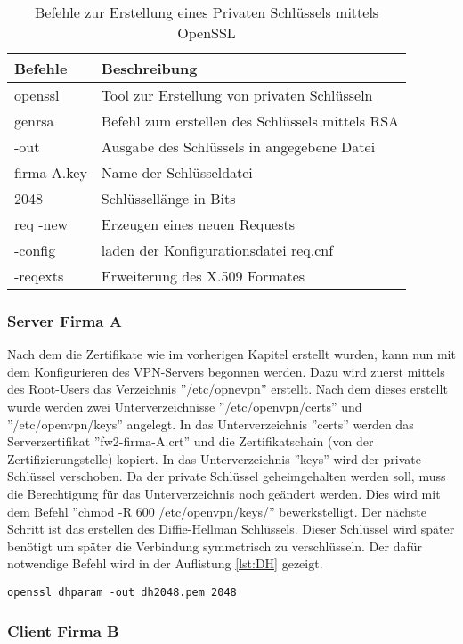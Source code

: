 \begin{table}[h]
	\centering
\begin{tabular}{|l|l|}
	\hline 
	Befehle & Beschreibung \\ 
	\hline 
	openssl & Tool zur Erstellung von privaten Schlüsseln \\ 
	\hline 
	genrsa & Befehl zum erstellen des Schlüssels mittels RSA \\ 
	\hline 
	-out & Ausgabe des Schlüssels in angegebene Datei \\ 
	\hline 
	firma-A.key & Name der Schlüsseldatei \\ 
	\hline 
	2048 & Schlüssellänge in Bits \\ 
	\hline 
	req -new & Erzeugen eines neuen Requests \\ 
	\hline 
	-config & laden der Konfigurationsdatei req.cnf \\ 
	\hline 
	-reqexts & Erweiterung des X.509 Formates \\ 
	\hline 
\end{tabular} 
\caption{Befehle zur Erstellung eines Privaten Schlüssels mittels OpenSSL} \label{tab:openSSLOptionen}
\end{table}

\subsubsection{Server Firma A}
Nach dem die Zertifikate wie im vorherigen Kapitel erstellt wurden, kann nun mit dem Konfigurieren des VPN-Servers begonnen werden. Dazu wird zuerst mittels des Root-Users das Verzeichnis ''/etc/opnevpn'' erstellt. Nach dem dieses erstellt wurde werden zwei Unterverzeichnisse ''/etc/openvpn/certs'' und ''/etc/openvpn/keys'' angelegt. In das Unterverzeichnis ''certs'' werden das Serverzertifikat ''fw2-firma-A.crt'' und die Zertifikatschain (von der Zertifizierungstelle) kopiert. In das Unterverzeichnis ''keys'' wird der private Schlüssel verschoben. Da der private Schlüssel geheimgehalten werden soll, muss die Berechtigung für das Unterverzeichnis noch geändert werden. Dies wird mit dem Befehl ''chmod -R 600 /etc/openvpn/keys/'' bewerkstelligt. Der nächste Schritt ist das erstellen des Diffie-Hellman Schlüssels. Dieser Schlüssel wird später benötigt um später die Verbindung symmetrisch zu verschlüsseln. Der dafür notwendige Befehl wird in der Auflistung \ref{lst:DH} gezeigt.\newline
\lstset{
	basicstyle=\footnotesize, frame=tb,
	xleftmargin=.2\textwidth, xrightmargin=.2\textwidth
}
\begin{lstlisting}[caption={Erzeugen des Diffie-Hellman Schlüssels},label=lst:DH]
openssl dhparam -out dh2048.pem 2048
\end{lstlisting}
\vspace{\baselineskip}



\subsubsection{Client Firma B}










